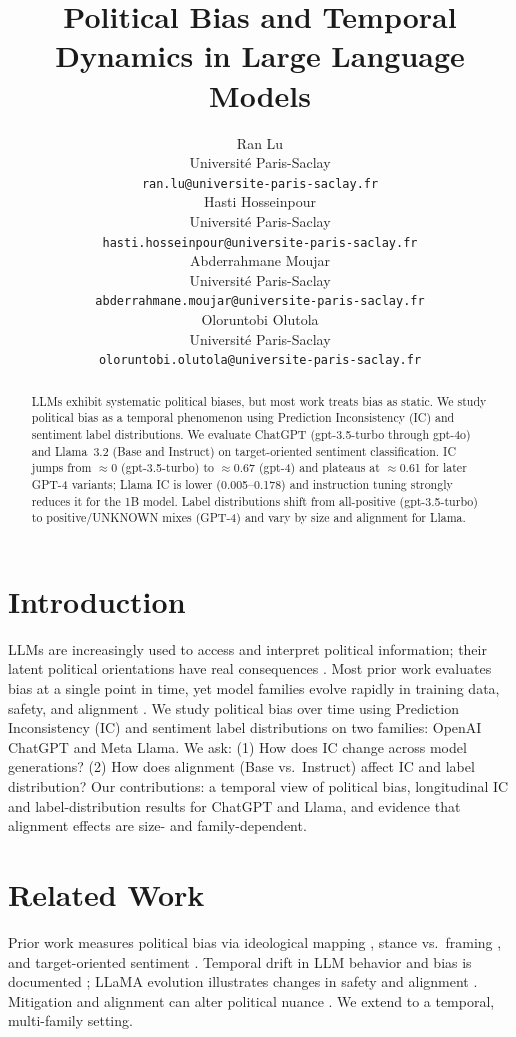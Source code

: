 \documentclass[11pt]{article}
\title{Political Bias and Temporal Dynamics in Large Language Models}
\author{Ran Lu \\
  Université Paris-Saclay \\
  \texttt{ran.lu@universite-paris-saclay.fr} \\\And
  Hasti Hosseinpour \\
  Université Paris-Saclay \\
  \texttt{hasti.hosseinpour@universite-paris-saclay.fr} \\\And
  Abderrahmane Moujar \\
  Université Paris-Saclay \\
  \texttt{abderrahmane.moujar@universite-paris-saclay.fr} \\\And
  Oloruntobi Olutola \\
  Université Paris-Saclay \\
  \texttt{oloruntobi.olutola@universite-paris-saclay.fr}}
\begin{document}
\maketitle

\begin{abstract}
LLMs exhibit systematic political biases, but most work treats bias as static. We study political bias as a temporal phenomenon using Prediction Inconsistency (IC) and sentiment label distributions. We evaluate ChatGPT (gpt-3.5-turbo through gpt-4o) and Llama~3.2 (Base and Instruct) on target-oriented sentiment classification. IC jumps from $\approx$0 (gpt-3.5-turbo) to $\approx$0.67 (gpt-4) and plateaus at $\approx$0.61 for later GPT-4 variants; Llama IC is lower (0.005--0.178) and instruction tuning strongly reduces it for the 1B model. Label distributions shift from all-positive (gpt-3.5-turbo) to positive/UNKNOWN mixes (GPT-4) and vary by size and alignment for Llama.
\end{abstract}

\section{Introduction}

LLMs are increasingly used to access and interpret political information; their latent political orientations have real consequences \citep{santurkar2023,buyl2026,hartmann2023,bang2024}. Most prior work evaluates bias at a single point in time, yet model families evolve rapidly in training data, safety, and alignment \citep{touvron2023,dubey2024}. We study political bias over time using Prediction Inconsistency (IC) \citep{elbouanani2025} and sentiment label distributions on two families: OpenAI ChatGPT and Meta Llama. We ask: (1) How does IC change across model generations? (2) How does alignment (Base vs.\ Instruct) affect IC and label distribution? Our contributions: a temporal view of political bias, longitudinal IC and label-distribution results for ChatGPT and Llama, and evidence that alignment effects are size- and family-dependent.

\section{Related Work}

Prior work measures political bias via ideological mapping \citep{santurkar2023,hartmann2023}, stance vs.\ framing \citep{bang2024}, and target-oriented sentiment \citep{wang2025,chen2024}. Temporal drift in LLM behavior and bias is documented \citep{zhu2024,buyl2026}; LLaMA evolution illustrates changes in safety and alignment \citep{touvron2023,dubey2024}. Mitigation and alignment can alter political nuance \citep{banko2025,bonaldi2024}. We extend \citet{elbouanani2025} to a temporal, multi-family setting.
\end{document}
